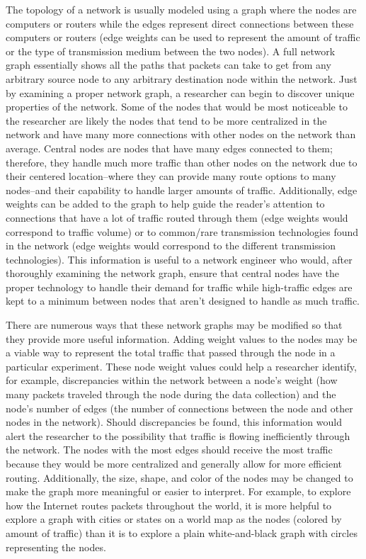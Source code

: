 \documentclass{sigcomm-alternate}
\begin{document}
	The topology of a network is usually modeled using a graph where the nodes are computers or routers while the edges represent direct connections between these computers or routers (edge weights can be used to represent the amount of traffic or the type of transmission medium between the two nodes). A full network graph essentially shows all the paths that packets can take to get from any arbitrary source node to any arbitrary destination node within the network. Just by examining a proper network graph, a researcher can begin to discover unique properties of the network. Some of the nodes that would be most noticeable to the researcher are likely the nodes that tend to be more centralized in the network and have many more connections with other nodes on the network than average. Central nodes are nodes that have many edges connected to them; therefore, they handle much more traffic than other nodes on the network due to their centered location–where they can provide many route options to many nodes–and their capability to handle larger amounts of traffic. Additionally, edge weights can be added to the graph to help guide the reader's attention to connections that have a lot of traffic routed through them (edge weights would correspond to traffic volume) or to common/rare transmission technologies found in the network (edge weights would correspond to the different transmission technologies). This information is useful to a network engineer who would, after thoroughly examining the network graph, ensure that central nodes have the proper technology to handle their demand for traffic while high-traffic edges are kept to a minimum between nodes that aren't designed to handle as much traffic.
	
	There are numerous ways that these network graphs may be modified so that they provide more useful information. Adding weight values to the nodes may be a viable way to represent the total traffic that passed through the node in a particular experiment. These node weight values could help a researcher identify, for example, discrepancies within the network between a node's weight (how many packets traveled through the node during the data collection) and the node's number of edges (the number of connections between the node and other nodes in the network). Should discrepancies be found, this information would alert the researcher to the possibility that traffic is flowing inefficiently through the network. The nodes with the most edges should receive the most traffic because they would be more centralized and generally allow for more efficient routing. Additionally, the size, shape, and color of the nodes may be changed to make the graph more meaningful or easier to interpret. For example, to explore how the Internet routes packets throughout the world, it is more helpful to explore a graph with cities or states on a world map as the nodes (colored by amount of traffic) than it is to explore a plain white-and-black graph with circles representing the nodes. 
	
\end{document}
